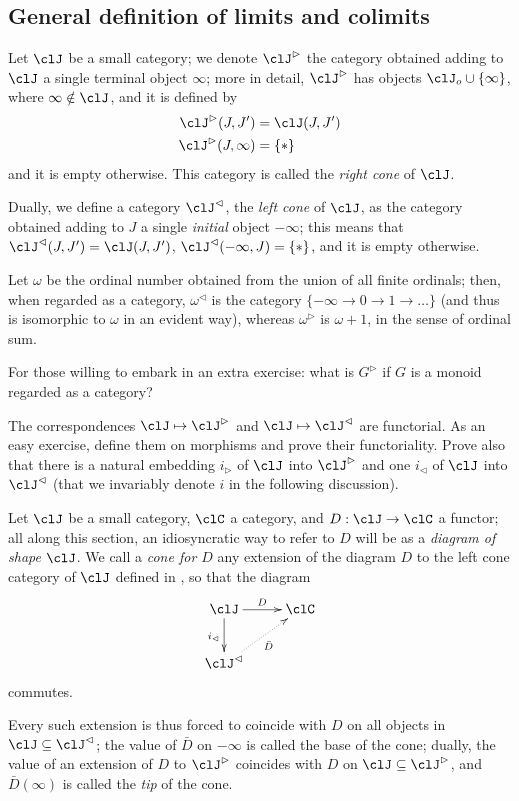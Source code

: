 \documentclass[11pt]{article}
\begin{document}
\subsection{General definition of limits and colimits}
\begin{definition}
	Let $\clJ$ be a small category; we denote $\clJ^\rhd$ the category obtained adding to $\clJ$ a single terminal object $\infty$; more in detail, $\clJ^\rhd$ has objects $\clJ_o \cup\{\infty\}$, where $\infty\notin \clJ$, and it is defined by
	\begin{align*}
		{\clJ^\rhd}(J,J')     & = \clJ(J,J') \\
		{\clJ^\rhd}(J,\infty) & = \{*\}
	\end{align*}
	and it is empty otherwise. This category is called the \emph{right cone} of $\clJ$.

	Dually, we define a category $\clJ^\lhd$, the \emph{left cone} of $\clJ$, as the category obtained adding to $J$ a single \emph{initial} object $-\infty$; this means that ${\clJ^\lhd}(J,J')=\clJ(J,J')$, ${\clJ^\lhd}(-\infty, J)=\{*\}$, and it is empty otherwise.
\end{definition}
\begin{example}
	Let $\omega$ be the ordinal number obtained from the union of all finite ordinals; then, when regarded as a category, $\omega^\lhd$ is the category $\{-\infty \to 0 \to 1\to \dots\}$ (and thus is isomorphic to $\omega$ in an evident way), whereas $\omega^\rhd$ is $\omega+1$, in the sense of ordinal sum.

	For those willing to embark in an extra exercise: what is $G^\rhd$ if $G$ is a monoid regarded as a category?
\end{example}
\begin{remark}
	The correspondences $\clJ\mapsto \clJ^\rhd$ and $\clJ\mapsto \clJ^\lhd$ are functorial. As an easy exercise, define them on morphisms and prove their functoriality. Prove also that there is a natural embedding $i_\rhd$ of $\clJ$ into $\clJ^\rhd$ and one $i_\lhd$ of $\clJ$ into $\clJ^\lhd$ (that we invariably denote $i$ in the following discussion).
\end{remark}
\begin{definition}
	Let $\clJ$ be a small category, $\clC$ a category, and $D : \clJ \to \clC$ a functor; all along this section, an idiosyncratic way to refer to $D$ will be as a \emph{diagram of shape $\clJ$}. We call a \emph{cone for $D$} any extension of the diagram $D$ to the left cone category of $\clJ$ defined in , so that the diagram
	\[
		\vcenter{\xymatrix{
				\clJ \ar[r]^D \ar[d]_{i_\lhd} & \clC \\
				\clJ^\lhd\ar@{.>}[ur]_{\bar D}
			}}
	\]
	commutes.
\end{definition}
Every such extension is thus forced to coincide with $D$ on all objects in $\clJ\subseteq \clJ^\lhd$; the value of $\bar D$ on $-\infty$ is called the base of the cone; dually, the value of an extension of $D$ to $\clJ^\rhd$ coincides with $D$ on $\clJ\subseteq \clJ^\rhd$, and $\bar D(\infty)$ is called the \emph{tip} of the cone.
\end{document}

